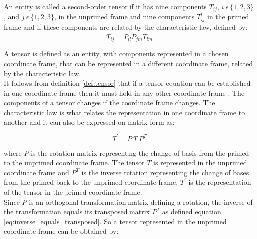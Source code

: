 \begin{definition}
\label{def:tensor}
An entity is called a second-order tensor if
it has nine components $T_{ij}$, $i \ \epsilon \ \lbrace 1,2,3
\rbrace$, and $j \ \epsilon \ \lbrace 1,2,3 \rbrace$, in the 
unprimed frame and nine components $T^\prime_{ij}$ in the primed frame and
if these components are related by the characteristic law, defined by:
\begin {equation}
\label{eq:bathe_2_60}
T^\prime_{ij} = P_{il} P_{jm} T_{lm}
\end {equation}
 
\end{definition}

A tensor is defined as an entity,
with components represented in a chosen coordinate frame, that can be
represented in a different coordinate frame, related by the
characteristic law. \\ 

It follows
from definition \vref{def:tensor} that if a tensor equation can be
established in one coordinate frame then it must hold in any other
coordinate frame . The components of a tensor changes if
the coordinate frame changes. The characteristic law is what 
relates the representation in one coordinate frame to another and it
can also be expressed on matrix form as:



\begin{equation}
\label{eq:primed_stress_tensor}
T^\prime = P \ T \ P^T
\end{equation}

where $P$ is the rotation matrix representing the change of basis from
the primed to the unprimed coordinate frame. The tensor $T$ is  
represented in the unprimed coordinate frame and $P^T$ is the
inverse rotation representing the change of bases from the primed back
to the unprimed coordinate frame. $T^\prime$ is the representation of
the tensor in the primed coordinate frame. \\

Since $P$ is an orthogonal transformation matrix defining a rotation,
the inverse of the transformation equals its transposed matrix
$P^T$ as defined equation \eqref{eq:inverse_equals_transposed}. So a tensor
represented in the unprimed coordinate frame can be obtained by:


